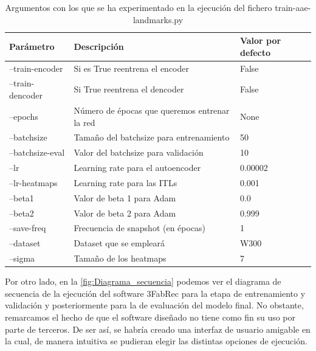 \begin{table}[!h]
    \centering
    \caption{Argumentos con los que se ha experimentado en la ejecución del fichero train-aae-landmarks.py}
    \begin{tabular}{|l|l|l|}
    \hline
        \cellcolor{gray!25}\textbf{Parámetro} & \cellcolor{gray!25}\textbf{Descripción} & \cellcolor{gray!25}\textbf{Valor por defecto} \\ \hline
        --train-encoder & Si es True reentrena el encoder & False \\ \hline
        --train-dencoder & Si True reentrena el dencoder & False \\ \hline
        --epochs & Número de épocas que queremos entrenar la red & None \\ \hline
        --batchsize & Tamaño del batchsize para entrenamiento & 50 \\ \hline
        --batchsize-eval & Valor del batchsize para validación & 10 \\ \hline
        --lr & Learning rate para el autoencoder & 0.00002 \\ \hline
        --lr-heatmaps & Learning rate para las ITLs & 0.001 \\ \hline
        --beta1 & Valor de beta 1 para Adam & 0.0 \\ \hline
        --beta2 & Valor de beta 2 para Adam & 0.999 \\ \hline
        --save-freq & Frecuencia de snapshot (en épocas) & 1 \\ \hline
        --dataset & Dataset que se empleará & W300 \\ \hline
        --sigma & Tamaño de los heatmaps & 7 \\ \hline
    \end{tabular}
    \label{table:Params}
\end{table}

\medskip

\noindent Por otro lado, en la \autoref{fig:Diagrama_secuencia} podemos ver el diagrama de secuencia de la ejecución del software 3FabRec para la etapa de entrenamiento y validación y posteriormente para la de evaluación del modelo final. No obstante, remarcamos el hecho de que el software diseñado no tiene como fin su uso por parte de terceros. De ser así, se habría creado una interfaz de usuario amigable en la cual, de manera intuitiva se pudieran elegir las distintas opciones de ejecución.

\newpage

